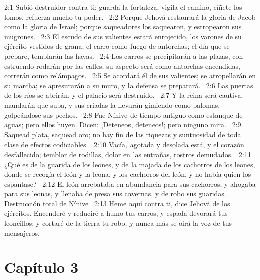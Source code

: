 2:1 Subió destruidor contra ti; guarda la fortaleza, vigila el camino, cíñete los lomos, refuerza mucho tu poder.  
2:2 Porque Jehová restaurará la gloria de Jacob como la gloria de Israel; porque saqueadores los saquearon, y estropearon sus mugrones.  
2:3 El escudo de sus valientes estará enrojecido, los varones de su ejército vestidos de grana; el carro como fuego de antorchas; el día que se prepare, temblarán las hayas.  
2:4 Los carros se precipitarán a las plazas, con estruendo rodarán por las calles; su aspecto será como antorchas encendidas, correrán como relámpagos.  
2:5 Se acordará él de sus valientes; se atropellarán en su marcha; se apresurarán a su muro, y la defensa se preparará.  
2:6 Las puertas de los ríos se abrirán, y el palacio será destruido.  
2:7 Y la reina será cautiva; mandarán que suba, y sus criadas la llevarán gimiendo como palomas, golpeándose sus pechos.  
2:8 Fue Nínive de tiempo antiguo como estanque de aguas; pero ellos huyen. Dicen: ¡Deteneos, deteneos!; pero ninguno mira.  
2:9 Saquead plata, saquead oro; no hay fin de las riquezas y suntuosidad de toda clase de efectos codiciables.  
2:10 Vacía, agotada y desolada está, y el corazón desfallecido; temblor de rodillas, dolor en las entrañas, rostros demudados.  
2:11 ¿Qué es de la guarida de los leones, y de la majada de los cachorros de los leones, donde se recogía el león y la leona, y los cachorros del león, y no había quien los espantase?  
2:12 El león arrebataba en abundancia para sus cachorros, y ahogaba para sus leonas, y llenaba de presa sus cavernas, y de robo sus guaridas.  
Destrucción total de Nínive  
2:13 Heme aquí contra ti, dice Jehová de los ejércitos. Encenderé y reduciré a humo tus carros, y espada devorará tus leoncillos; y cortaré de la tierra tu robo, y nunca más se oirá la voz de tus mensajeros.  
\section*{Capítulo 3 }

